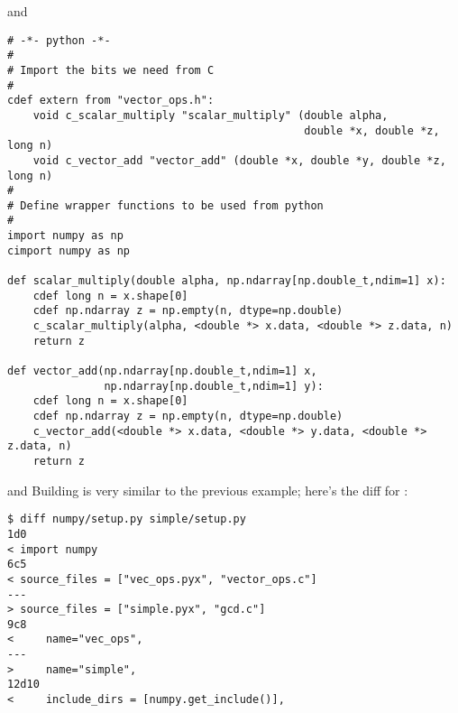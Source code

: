 \documentclass[10pt, t]{beamer}
\let\texttt=\graytt
\begin{document}
\begin{frame}[fragile,label=sec-4-4]{\texttt{cython} and \texttt{numpy}}
 \lstset{language=Python,label= ,caption= ,numbers=none}
\begin{lstlisting}
# -*- python -*-
#
# Import the bits we need from C
#
cdef extern from "vector_ops.h":
    void c_scalar_multiply "scalar_multiply" (double alpha,
                                              double *x, double *z, long n)
    void c_vector_add "vector_add" (double *x, double *y, double *z, long n)
#
# Define wrapper functions to be used from python
#
import numpy as np
cimport numpy as np

def scalar_multiply(double alpha, np.ndarray[np.double_t,ndim=1] x):
    cdef long n = x.shape[0]
    cdef np.ndarray z = np.empty(n, dtype=np.double)
    c_scalar_multiply(alpha, <double *> x.data, <double *> z.data, n)
    return z

def vector_add(np.ndarray[np.double_t,ndim=1] x,
               np.ndarray[np.double_t,ndim=1] y):
    cdef long n = x.shape[0]
    cdef np.ndarray z = np.empty(n, dtype=np.double)
    c_vector_add(<double *> x.data, <double *> y.data, <double *> z.data, n)
    return z
\end{lstlisting}
\end{frame}

\begin{frame}[fragile,label=sec-4-5]{\texttt{cython} and \texttt{numpy}}
 Building is very similar to the previous example; here's the diff for :
\lstset{language=sh,label= ,caption= ,numbers=none}
\begin{lstlisting}
$ diff numpy/setup.py simple/setup.py 
1d0
< import numpy
6c5
< source_files = ["vec_ops.pyx", "vector_ops.c"]
---
> source_files = ["simple.pyx", "gcd.c"]
9c8
<     name="vec_ops",
---
>     name="simple",
12d10
<     include_dirs = [numpy.get_include()],
\end{lstlisting}
\end{frame}
\end{document}
